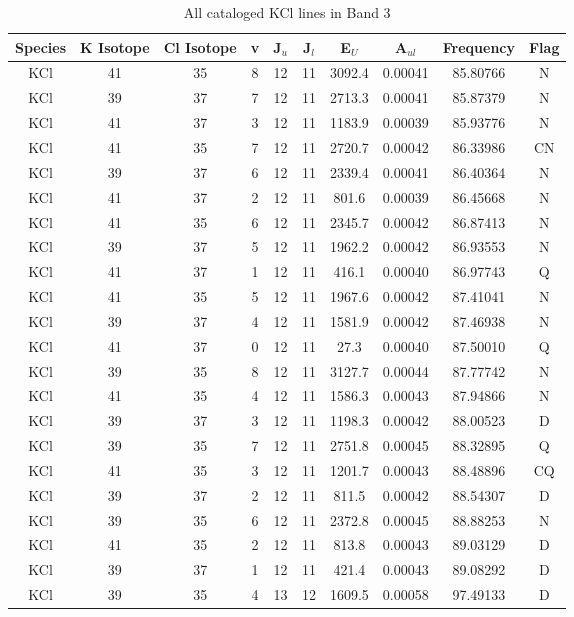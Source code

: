 \begin{table*}[htp]
\centering
\caption{All cataloged KCl lines in Band 3}
\begin{tabular}{cccccccccc}
\label{tab:K_detections_B3}
Species & K Isotope & Cl Isotope & v & J$_u$ & J$_l$ & E$_U$ & A$_{ul}$ & Frequency & Flag \\
\hline
KCl & 41 & 35 & 8 & 12 & 11 & 3092.4 & 0.00041 & 85.80766 & N \\
KCl & 39 & 37 & 7 & 12 & 11 & 2713.3 & 0.00041 & 85.87379 & N \\
KCl & 41 & 37 & 3 & 12 & 11 & 1183.9 & 0.00039 & 85.93776 & N \\
KCl & 41 & 35 & 7 & 12 & 11 & 2720.7 & 0.00042 & 86.33986 & CN \\
KCl & 39 & 37 & 6 & 12 & 11 & 2339.4 & 0.00041 & 86.40364 & N \\
KCl & 41 & 37 & 2 & 12 & 11 & 801.6 & 0.00039 & 86.45668 & N \\
KCl & 41 & 35 & 6 & 12 & 11 & 2345.7 & 0.00042 & 86.87413 & N \\
KCl & 39 & 37 & 5 & 12 & 11 & 1962.2 & 0.00042 & 86.93553 & N \\
KCl & 41 & 37 & 1 & 12 & 11 & 416.1 & 0.00040 & 86.97743 & Q \\
KCl & 41 & 35 & 5 & 12 & 11 & 1967.6 & 0.00042 & 87.41041 & N \\
KCl & 39 & 37 & 4 & 12 & 11 & 1581.9 & 0.00042 & 87.46938 & N \\
KCl & 41 & 37 & 0 & 12 & 11 & 27.3 & 0.00040 & 87.50010 & Q \\
KCl & 39 & 35 & 8 & 12 & 11 & 3127.7 & 0.00044 & 87.77742 & N \\
KCl & 41 & 35 & 4 & 12 & 11 & 1586.3 & 0.00043 & 87.94866 & N \\
KCl & 39 & 37 & 3 & 12 & 11 & 1198.3 & 0.00042 & 88.00523 & D \\
KCl & 39 & 35 & 7 & 12 & 11 & 2751.8 & 0.00045 & 88.32895 & Q \\
KCl & 41 & 35 & 3 & 12 & 11 & 1201.7 & 0.00043 & 88.48896 & CQ \\
KCl & 39 & 37 & 2 & 12 & 11 & 811.5 & 0.00042 & 88.54307 & D \\
KCl & 39 & 35 & 6 & 12 & 11 & 2372.8 & 0.00045 & 88.88253 & N \\
KCl & 41 & 35 & 2 & 12 & 11 & 813.8 & 0.00043 & 89.03129 & D \\
KCl & 39 & 37 & 1 & 12 & 11 & 421.4 & 0.00043 & 89.08292 & D \\
KCl & 39 & 35 & 4 & 13 & 12 & 1609.5 & 0.00058 & 97.49133 & D \\

\end{tabular}
\end{table*}
